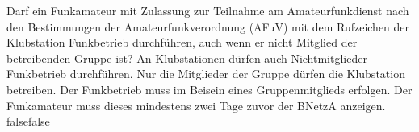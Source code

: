     {Darf ein Funkamateur mit Zulassung zur Teilnahme am Amateurfunkdienst nach den Bestimmungen der Amateurfunkverordnung (AFuV) mit dem Rufzeichen der Klubstation Funkbetrieb durchführen, auch wenn er nicht Mitglied der betreibenden Gruppe ist?}
    {An Klubstationen dürfen auch Nichtmitglieder Funkbetrieb durchführen.}
    {Nur die Mitglieder der Gruppe dürfen die Klubstation betreiben.}
    {Der Funkbetrieb muss im Beisein eines Gruppenmitglieds erfolgen.}
    {Der Funkamateur muss dieses mindestens zwei Tage zuvor der BNetzA anzeigen.}
    {false}{false}